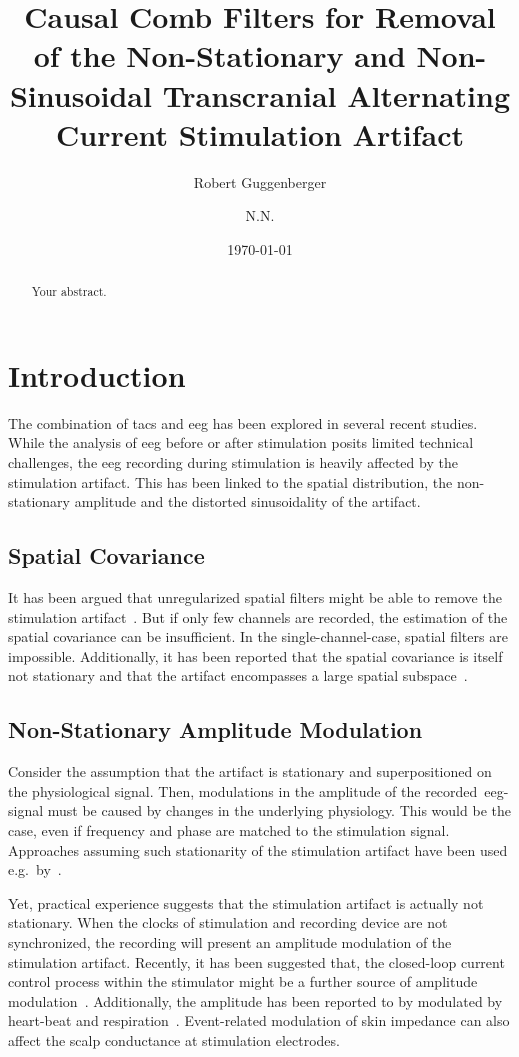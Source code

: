\documentclass[a4paper]{article}
\title{Causal Comb Filters for Removal of the Non-Stationary and Non-Sinusoidal Transcranial Alternating Current Stimulation Artifact}
\author[1,*]{Robert Guggenberger}
\author[1]{N.N.}
\affil[1]{Department for Translational Neurosurgery, University Hospital Tübingen}
\affil[*]{Corresponding author: \email{robert.guggenberger@posteo.eu}}
\date{\today}
\begin{document}
\maketitle
\thispagestyle{fancy}

\begin{abstract}
Your abstract.
\end{abstract}

\section{Introduction}

The combination of \gls{tacs} and \gls{eeg} has been explored in several recent studies. While the analysis of \gls{eeg} before or after stimulation posits limited technical challenges, the \gls{eeg} recording during stimulation is heavily affected by the stimulation artifact. This has been linked to the spatial distribution, the non-stationary amplitude and the distorted sinusoidality of the artifact.

\subsection{Spatial Covariance}

It has been argued that unregularized spatial filters might be able to remove the stimulation artifact~\citep{Neuling_2017}. But if only few channels are recorded, the estimation of the spatial covariance can be insufficient. In the single-channel-case, spatial filters are impossible.
Additionally, it has been reported that the spatial covariance is itself not stationary and that the artifact encompasses a large spatial subspace~\citep{Noury_2016}.

\subsection{Non-Stationary Amplitude Modulation}

Consider the assumption that the artifact is stationary and superpositioned on the physiological signal.
Then, modulations in the amplitude of the recorded~\gls{eeg}-signal must be caused by changes in the underlying physiology.
This would be the case, even if frequency and phase are matched to the stimulation signal. Approaches assuming such stationarity of the stimulation artifact have been used e.g.\ by~\cite{Pogosyan_2009}.

Yet, practical experience suggests that the stimulation artifact is actually not stationary. When the clocks of stimulation and recording device are not synchronized, the recording will present an amplitude modulation of the stimulation artifact. Recently, it has been suggested that, the closed-loop current control process within the stimulator might be a further source of amplitude modulation~\citep{Neuling_2017}.
Additionally, the amplitude has been reported to by modulated by heart-beat and respiration~\citep{Noury_2016}. Event-related modulation of skin impedance can also affect the scalp conductance at stimulation electrodes.
\end{document}
